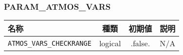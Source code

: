 \subsubsection{PARAM\_ATMOS\_VARS}
\begin{tabularx}{150mm}{|l|c|c|X|} \hline
 \rowcolor[gray]{0.9} 名称 & 種類 & 初期値 & 説明 \\ \hline
 \verb|ATMOS_VARS_CHECKRANGE| & logical & .false. & N/A  \\ \hline
\end{tabularx}

